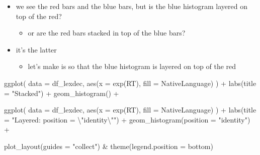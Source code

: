 \documentclass[
  letterpaper,
  DIV=11]{scrartcl}
\newenvironment{Shaded}{\begin{snugshade}}{\end{snugshade}}
\newcommand{\AttributeTok}[1]{\textcolor[rgb]{0.40,0.45,0.13}{#1}}
\newcommand{\FunctionTok}[1]{\textcolor[rgb]{0.28,0.35,0.67}{#1}}
\newcommand{\NormalTok}[1]{\textcolor[rgb]{0.00,0.23,0.31}{#1}}
\newcommand{\SpecialCharTok}[1]{\textcolor[rgb]{0.37,0.37,0.37}{#1}}
\newcommand{\StringTok}[1]{\textcolor[rgb]{0.13,0.47,0.30}{#1}}
\providecommand{\tightlist}{%
  \setlength{\itemsep}{0pt}\setlength{\parskip}{0pt}}\usepackage{longtable,booktabs,array}
\theoremstyle{definition}
\theoremstyle{remark}
\begin{document}
\begin{itemize}
\tightlist
\item
  we see the red bars and the blue bars, but is the blue histogram
  layered on top of the red?

  \begin{itemize}
  \tightlist
  \item
    or are the red bars stacked in top of the blue bars?
  \end{itemize}
\item
  it's the latter

  \begin{itemize}
  \tightlist
  \item
    let's make is so that the blue histogram is layered on top of the
    red
  \end{itemize}
\end{itemize}

\begin{Shaded}
\begin{Highlighting}[]
\FunctionTok{ggplot}\NormalTok{(}
  \AttributeTok{data =}\NormalTok{ df\_lexdec,}
  \FunctionTok{aes}\NormalTok{(}\AttributeTok{x =} \FunctionTok{exp}\NormalTok{(RT), }\AttributeTok{fill =}\NormalTok{ NativeLanguage)}
\NormalTok{) }\SpecialCharTok{+}
  \FunctionTok{labs}\NormalTok{(}\AttributeTok{title =} \StringTok{"Stacked"}\NormalTok{) }\SpecialCharTok{+}
  \FunctionTok{geom\_histogram}\NormalTok{() }\SpecialCharTok{+} 
  
\FunctionTok{ggplot}\NormalTok{(}
  \AttributeTok{data =}\NormalTok{ df\_lexdec,}
  \FunctionTok{aes}\NormalTok{(}\AttributeTok{x =} \FunctionTok{exp}\NormalTok{(RT), }\AttributeTok{fill =}\NormalTok{ NativeLanguage)}
\NormalTok{) }\SpecialCharTok{+}
  \FunctionTok{labs}\NormalTok{(}\AttributeTok{title =} \StringTok{"Layered: position = }\SpecialCharTok{\textbackslash{}"}\StringTok{identity}\SpecialCharTok{\textbackslash{}"}\StringTok{"}\NormalTok{) }\SpecialCharTok{+}
  \FunctionTok{geom\_histogram}\NormalTok{(}\AttributeTok{position =} \StringTok{"identity"}\NormalTok{) }\SpecialCharTok{+}
  
  
  \FunctionTok{plot\_layout}\NormalTok{(}\AttributeTok{guides =} \StringTok{"collect"}\NormalTok{) }\SpecialCharTok{\&} \FunctionTok{theme}\NormalTok{(}\AttributeTok{legend.position =} \StringTok{\textquotesingle{}bottom\textquotesingle{}}\NormalTok{) }
\end{Highlighting}
\end{Shaded}
\end{document}

